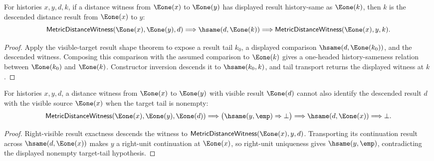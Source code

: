 \begin{theorem}
\label{thm:metric-distance-witness-left-e1-visible-target-result-tail-hsame-exact}
For histories $x,y,d,k$, if a distance witness from $\Eone(x)$ to
$\Eone(y)$ has displayed result history-same as $\Eone(k)$, then $k$ is the
descended distance result from $\Eone(x)$ to $y$:
$$
\mathsf{MetricDistanceWitness}(\Eone(x),\Eone(y),d)
\Longrightarrow
\hsame(d,\Eone(k))
\Longrightarrow
\mathsf{MetricDistanceWitness}(\Eone(x),y,k).
$$
\end{theorem}
\begin{proof}
Apply the visible-target result shape theorem to expose a result tail $k_0$,
a displayed comparison $\hsame(d,\Eone(k_0))$, and the descended witness.
Composing this comparison with the assumed comparison to $\Eone(k)$ gives a
one-headed history-sameness relation between $\Eone(k_0)$ and $\Eone(k)$.
Constructor inversion descends it to $\hsame(k_0,k)$, and tail transport
returns the displayed witness at $k$.
\end{proof}

\begin{theorem}
\label{thm:metric-distance-witness-left-e1-visible-target-result-source-absurd}
For histories $x,y,d$, a distance witness from $\Eone(x)$ to $\Eone(y)$ with
visible result $\Eone(d)$ cannot also identify the descended result $d$ with
the visible source $\Eone(x)$ when the target tail is nonempty:
$$
\mathsf{MetricDistanceWitness}(\Eone(x),\Eone(y),\Eone(d))
\Longrightarrow
\bigl(\hsame(y,\emp)\Rightarrow\bot\bigr)
\Longrightarrow
\hsame(d,\Eone(x))
\Longrightarrow
\bot.
$$
\end{theorem}
\begin{proof}
Right-visible result exactness descends the witness to
$\mathsf{MetricDistanceWitness}(\Eone(x),y,d)$. Transporting its continuation
result across $\hsame(d,\Eone(x))$ makes $y$ a right-unit continuation at
$\Eone(x)$, so right-unit uniqueness gives $\hsame(y,\emp)$, contradicting the
displayed nonempty target-tail hypothesis.
\end{proof}

